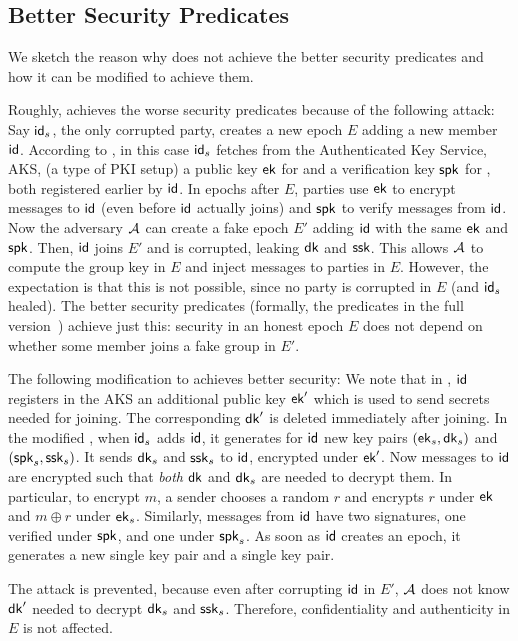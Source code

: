 \subsection{Better Security Predicates}\label{sec:ext-sec-predicates}
We sketch the reason why \saik does not achieve the better security predicates and how it can be modified to achieve them.

Roughly, \saik achieves the worse security predicates because of the following attack: Say ${\mathsf{id}}_s$, the only corrupted party, creates a new epoch $E$ adding a new member ${\mathsf{id}}$. According to \saik, in this case ${\mathsf{id}}_s$ fetches from the Authenticated Key Service, AKS, (a type of PKI setup) a public key ${\mathsf{ek}}$ for \mmPKE and a verification key ${\mathsf{spk}}$ for \sigscheme, both registered earlier by ${\mathsf{id}}$. In epochs after $E$, parties use ${\mathsf{ek}}$ to encrypt messages to ${\mathsf{id}}$ (even before ${\mathsf{id}}$ actually joins) and ${\mathsf{spk}}$ to verify messages from ${\mathsf{id}}$. Now the adversary $\mathcal{A}_{\relax}$ can create a fake epoch $E'$ adding ${\mathsf{id}}$ with the same ${\mathsf{ek}}$ and ${\mathsf{spk}}$. Then, ${\mathsf{id}}$ joins $E'$ and is corrupted, leaking ${\mathsf{dk}}$ and ${\mathsf{ssk}}$. This allows $\mathcal{A}_{\relax}$ to compute the group key in $E$ and inject messages to parties in $E$. However, the expectation is that this is not possible, since no party is corrupted in $E$ (and ${\mathsf{id}}_s$ healed).
%
The better security predicates (formally, the predicates in the full version~\cite{EPRINT:AHKM21}) achieve just this: security in an honest epoch $E$ does not depend on whether some member joins a fake group in $E'$.

The following modification to \saik achieves better security: We note that in \saik, ${\mathsf{id}}$ registers in the AKS an additional public key ${\mathsf{ek}}'$ which is used to send secrets needed for joining. The corresponding ${\mathsf{dk}}'$ is deleted immediately after joining. In the modified \saik, when ${\mathsf{id}}_s$ adds ${\mathsf{id}}$, it generates for ${\mathsf{id}}$ new key pairs $({\mathsf{ek}}_s,{\mathsf{dk}}_s)$ and $({\mathsf{spk}}_s,{\mathsf{ssk}}_s)$. It sends ${\mathsf{dk}}_s$ and ${\mathsf{ssk}}_s$ to ${\mathsf{id}}$, encrypted under ${\mathsf{ek}}'$. Now messages to ${\mathsf{id}}$ are encrypted such that \emph{both} ${\mathsf{dk}}$ and ${\mathsf{dk}}_s$ are needed to decrypt them. In particular, to encrypt $m$, a sender chooses a random $r$ and encrypts $r$ under ${\mathsf{ek}}$ and $m \oplus r$ under ${\mathsf{ek}}_s$. Similarly, messages from ${\mathsf{id}}$ have two signatures, one verified under ${\mathsf{spk}}$, and one under ${\mathsf{spk}}_s$. As soon as ${\mathsf{id}}$ creates an epoch, it generates a new single \mmPKE key pair and a single \ers key pair.

The attack is prevented, because even after corrupting ${\mathsf{id}}$ in $E'$, $\mathcal{A}_{\relax}$ does not know ${\mathsf{dk}}'$ needed to decrypt ${\mathsf{dk}}_s$ and ${\mathsf{ssk}}_s$. Therefore, confidentiality and authenticity in $E$ is not affected.

